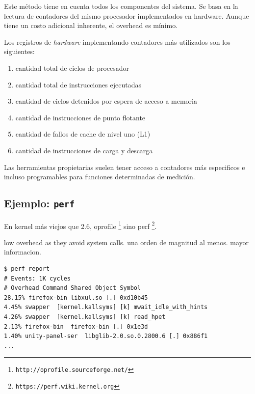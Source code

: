 \documentclass[a4paper]{report}
\begin{document}
Este m\'etodo tiene en cuenta todos los componentes del sistema.
Se basa en la lectura de contadores del mismo procesador implementados en hardware.
Aunque tiene un costo adicional inherente, el overhead es m\'inimo.

Los registros de {\it hardware} implementando contadores m\'as utilizados son los
siguientes:

\begin{enumerate}
\item cantidad total de ciclos de procesador
\item cantidad total de instrucciones ejecutadas
\item cantidad de ciclos detenidos por espera de acceso a memoria
\item cantidad de instrucciones de punto flotante
\item cantidad de fallos de cache de nivel uno (L1)
\item cantidad de instrucciones de carga y descarga
\end{enumerate}

Las herramientas propietarias suelen tener acceso a contadores m\'as especificos e
incluso programables para funciones determinadas de medici\'on.

\subsection{Ejemplo: {\tt perf}}

En kernel más viejos que 2.6, oprofile \footnote{\tt http://oprofile.sourceforge.net/} sino perf \footnote{\tt https://perf.wiki.kernel.org}.

low overhead as they avoid system calls. una orden de magnitud al menos. mayor informacion.

\begin{lstlisting}
$ perf report
# Events: 1K cycles
# Overhead Command Shared Object Symbol
28.15% firefox-bin libxul.so [.] 0xd10b45
4.45% swapper  [kernel.kallsyms] [k] mwait_idle_with_hints
4.26% swapper  [kernel.kallsyms] [k] read_hpet
2.13% firefox-bin  firefox-bin [.] 0x1e3d
1.40% unity-panel-ser  libglib-2.0.so.0.2800.6 [.] 0x886f1
...
\end{lstlisting}
\end{document}
